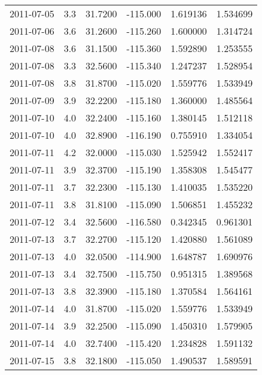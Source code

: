 \begin{tabular}{lrrrrr}
2011-07-05 &       3.3 &  31.7200 &  -115.000 &         1.619136 &         1.534699 \\
2011-07-06 &       3.6 &  31.2600 &  -115.260 &         1.600000 &         1.314724 \\
2011-07-08 &       3.6 &  31.1500 &  -115.360 &         1.592890 &         1.253555 \\
2011-07-08 &       3.3 &  32.5600 &  -115.340 &         1.247237 &         1.528954 \\
2011-07-08 &       3.8 &  31.8700 &  -115.020 &         1.559776 &         1.533949 \\
2011-07-09 &       3.9 &  32.2200 &  -115.180 &         1.360000 &         1.485564 \\
2011-07-10 &       4.0 &  32.2400 &  -115.160 &         1.380145 &         1.512118 \\
2011-07-10 &       4.0 &  32.8900 &  -116.190 &         0.755910 &         1.334054 \\
2011-07-11 &       4.2 &  32.0000 &  -115.030 &         1.525942 &         1.552417 \\
2011-07-11 &       3.9 &  32.3700 &  -115.190 &         1.358308 &         1.545477 \\
2011-07-11 &       3.7 &  32.2300 &  -115.130 &         1.410035 &         1.535220 \\
2011-07-11 &       3.8 &  31.8100 &  -115.090 &         1.506851 &         1.455232 \\
2011-07-12 &       3.4 &  32.5600 &  -116.580 &         0.342345 &         0.961301 \\
2011-07-13 &       3.7 &  32.2700 &  -115.120 &         1.420880 &         1.561089 \\
2011-07-13 &       4.0 &  32.0500 &  -114.900 &         1.648787 &         1.690976 \\
2011-07-13 &       3.4 &  32.7500 &  -115.750 &         0.951315 &         1.389568 \\
2011-07-13 &       3.8 &  32.3900 &  -115.180 &         1.370584 &         1.564161 \\
2011-07-14 &       4.0 &  31.8700 &  -115.020 &         1.559776 &         1.533949 \\
2011-07-14 &       3.9 &  32.2500 &  -115.090 &         1.450310 &         1.579905 \\
2011-07-14 &       4.0 &  32.7400 &  -115.420 &         1.234828 &         1.591132 \\
2011-07-15 &       3.8 &  32.1800 &  -115.050 &         1.490537 &         1.589591 \\

\end{tabular}
